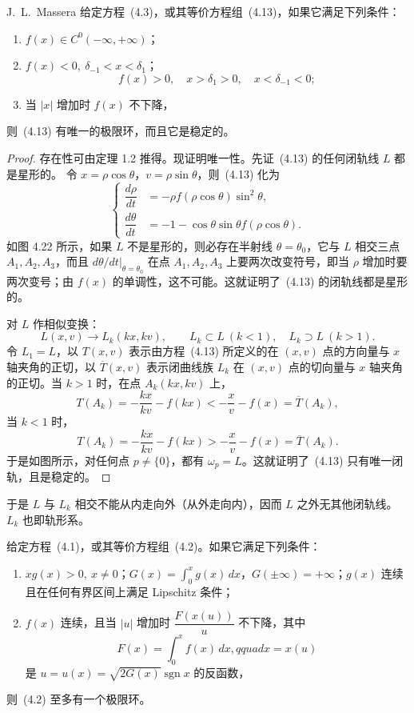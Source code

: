 \begin{theorem}{J.~L.~Massera}{ }
给定方程~(4.3)，或其等价方程组~(4.13)，如果它满足下列条件：
\begin{enumerate}
\item $f(x)\in C^0(-\infty,+\infty)$；
\item $f(x)<0,\ \delta_{-1}<x<\delta_1$；
\[
f(x)>0,\quad x>\delta_1>0,\quad x<\delta_{-1}<0;
\]
\item 当 $|x|$ 增加时 $f(x)$ 不下降，
\end{enumerate}
则~(4.13) 有唯一的极限环，而且它是稳定的。
\end{theorem}

\begin{proof}
存在性可由定理 1.2 推得。现证明唯一性。先证~(4.13) 的任何闭轨线 $L$ 都是星形的。
令 $x=\rho\cos\theta$，$v=\rho\sin\theta$，则~(4.13) 化为
\[
\left\{
\begin{aligned}
\dfrac{d\rho}{dt}&=-\rho f(\rho\cos\theta)\sin^2\theta,\\
\dfrac{d\theta}{dt}&=-1-\cos\theta\sin\theta f(\rho\cos\theta).
\end{aligned}\right.
\]
如图 4.22 所示，如果 $L$ 不是星形的，则必存在半射线 $\theta=\theta_0$，它与 $L$ 相交三点
$A_1,A_2,A_3$，而且 $\left.d\theta/dt\right|_{\theta=\theta_0}$ 在点 $A_1,A_2,A_3$ 上要两次改变符号，即当 $\rho$ 增加时要两次变号；由 $f(x)$ 的单调性，这不可能。这就证明了~(4.13) 的闭轨线都是星形的。

对 $L$ 作相似变换：
\[
L(x,v)\longrightarrow L_k(kx,kv),\qquad L_k\subset L\ (k<1),\quad L_k\supset L\ (k>1).
\]
令 $L_1=L$，以 $T(x,v)$ 表示由方程~(4.13) 所定义的在 $(x,v)$ 点的方向量与 $x$ 轴夹角的正切，以 $\overline{T}(x,v)$ 表示闭曲线族 $L_k$ 在 $(x,v)$ 点的切向量与 $x$ 轴夹角的正切。当 $k>1$ 时，在点 $A_k(kx,kv)$ 上，
\[
T(A_k)=-\dfrac{kx}{kv}-f(kx)<-\dfrac{x}{v}-f(x)=\overline{T}(A_k),
\]
当 $k<1$ 时，
\[
T(A_k)=-\dfrac{kx}{kv}-f(kx)>-\dfrac{x}{v}-f(x)=\overline{T}(A_k).
\]
于是如图所示，对任何点 $p\ne\{0\}$，都有 $\omega_p=L$。这就证明了~(4.13) 只有唯一闭轨，且是稳定的。
\end{proof}

于是 $L$ 与 $L_k$ 相交不能从内走向外（从外走向内），因而 $L$ 之外无其他闭轨线。$L_k$ 也即轨形系。

\begin{theorem}{}{ }
给定方程~(4.1)，或其等价方程组~(4.2)。如果它满足下列条件：
\begin{enumerate}
\item $xg(x)>0,\ x\ne0$；$G(x)=\displaystyle\int_0^xg(x)\,dx$，$G(\pm\infty)=+\infty$；$g(x)$ 连续且在任何有界区间上满足 Lipschitz 条件；
\item $f(x)$ 连续，且当 $|u|$ 增加时 $\dfrac{F(x(u))}{u}$ 不下降，其中
\[
F(x)=\int_0^xf(x)\,dx,qquad x=x(u)
\]
是 $u=u(x)=\sqrt{2G(x)}\operatorname{sgn}x$ 的反函数，
\end{enumerate}
则~(4.2) 至多有一个极限环。
\end{theorem}


